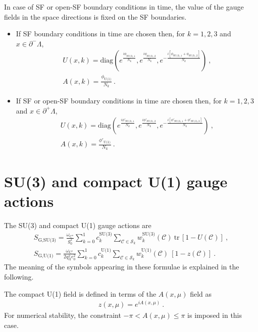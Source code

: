 \documentclass[11pt,fleqn]{article}
\newcommand{\tr}{\mathrm{tr}\,}
\begin{document}
In case of SF or open-SF boundary conditions in time, the value of the gauge fields in the space directions is fixed on the SF boundaries.
\begin{itemize}[nolistsep,noitemsep]
   \item If SF boundary conditions in time are chosen then, for $k=1,2,3$ and $x\in \partial^- \Lambda$,
   \begin{gather}
      U(x,k) = \text{diag} \left( e^{\frac{i \phi_{\text{SU(3)},1}}{N_k}} , e^{\frac{i \phi_{\text{SU(3)},2}}{N_k}} , e^{-\frac{i [\phi_{\text{SU(3)},1}+\phi_{\text{SU(3)},2}]}{N_k}} \right)
      \ , \\
      A(x,k) = \frac{\phi_\text{U(1)}}{N_k} \ .
   \end{gather}
   \item If SF or open-SF boundary conditions in time are chosen then, for $k=1,2,3$ and $x\in \partial^+ \Lambda$,
   \begin{gather}
      U(x,k) = \text{diag} \left( e^{\frac{i \phi'_{\text{SU(3)},1}}{N_k}} , e^{\frac{i \phi'_{\text{SU(3)},2}}{N_k}} , e^{-\frac{i [\phi'_{\text{SU(3)},1}+\phi'_{\text{SU(3)},2}]}{N_k}} \right)
      \ , \\
      A(x,k) = \frac{\phi'_\text{U(1)}}{N_k} \ .
   \end{gather}
\end{itemize}





\section{SU(3) and compact U(1) gauge actions}

The SU(3) and compact U(1) gauge actions are
\begin{gather}
   S_{\text{G,SU(3)}} = \frac{\omega_{\text{C}^\star}}{g_0^2} \sum_{k=0}^1 c^\text{SU(3)}_k \sum_{\mathcal{C} \in \mathcal{S}_k} w^\text{SU(3)}_k(\mathcal{C}) \ \tr [ 1 - U(\mathcal{C}) ] \ ,
   \label{eq:action:SU3} \\
   S_{\text{G,U(1)}} = \frac{\omega_{\text{C}^\star}}{2 q_\text{el}^2 e_0^2} \sum_{k=0}^1 c^\text{U(1)}_k \sum_{\mathcal{C} \in \mathcal{S}_k} w^\text{U(1)}_k(\mathcal{C}) \ [ 1 - z(\mathcal{C}) ] \ .
   \label{eq:action:U1}
\end{gather}
The meaning of the symbols appearing in these formulae is explained in the following.

The compact U(1) field is defined in terms of the $A(x,\mu)$ field as
\begin{gather}
   z(x,\mu) = e^{i A(x,\mu)} \ .
\end{gather}
For numerical stability, the constraint $-\pi < A(x,\mu) \le \pi$ is imposed in this case.
\end{document}
